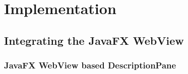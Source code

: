 \chapter{Implementation}\label{chap:implementation}



\section{Integrating the JavaFX WebView}
\subsection{JavaFX WebView based DescriptionPane}

